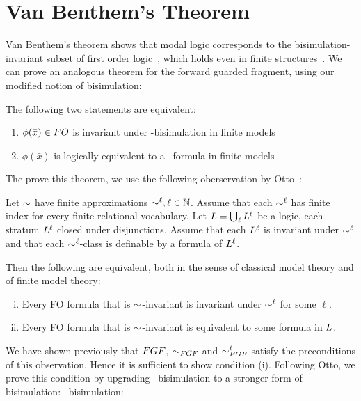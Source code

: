 

\section{Van Benthem's Theorem}\label{sec:van-benthem-theorem}
Van Benthem's theorem shows that modal logic corresponds to the bisimulation-invariant subset of first order logic~\cite{van1983modal}, which holds even in finite structures~\cite{Rosen97}.
We can prove an analogous theorem for the forward guarded fragment, using our modified notion of bisimulation:

\begin{theorem}
  The following two statements are equivalent:
  \begin{enumerate}
    \item $\phi(\bar{x}) \in \Logic{FO}$ is invariant under \FGF-bisimulation in finite models
    \item $\phi(\bar{x})$ is logically equivalent to a \FGF~formula in finite models
  \end{enumerate}
\end{theorem}

The prove this theorem, we use the following oberservation by Otto~\cite{Otto04}:
\begin{observation}
  Let $\sim$ have finite approximations $\sim^{\ell}, \ell \in \mathbb{N}$.
  Assume that each $\sim^{\ell}$ has finite index for every finite relational vocabulary.
  Let $\Logic{L} = \bigcup_{\ell}{\Logic{L}^{\ell}}$ be a logic, each stratum $\Logic{L}^{\ell}$ closed under disjunctions.
  Assume that each $\Logic{L}^{\ell}$ is invariant under $\sim^{\ell}$ and that each $\sim^{\ell}$-class is definable by a formula of $\Logic{L}^{\ell}$.

  Then the following are equivalent, both in the sense of classical model theory and of finite model theory:
  \begin{enumerate}[(i)]
    \item Every FO formula that is $\sim$-invariant is invariant under $\sim^{\ell}$ for some $\ell$.
    \item Every FO formula that is $\sim$-invariant is equivalent to some formula in $\Logic{L}$.
  \end{enumerate}
\end{observation}

We have shown previously that $\FGF$, $\bisimto_{\FGF}$ and $\bisimto_{\FGF}^{\ell}$ satisfy the preconditions of this observation.
Hence it is sufficient to show condition (i).
Following Otto, we prove this condition by upgrading \FGF~bisimulation to a stronger form of bisimulation: \GF~bisimulation:

